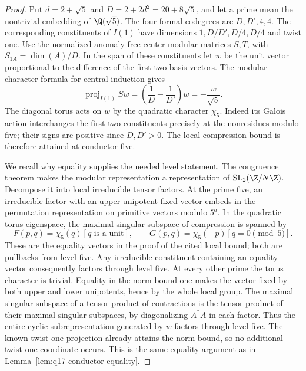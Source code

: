 \begin{proof}
Put $d=2+\sqrt5$ and $D=2+2d^2=20+8\sqrt5$, and let a prime
mean the nontrivial embedding of $\Q(\sqrt5)$. The four formal
codegrees are $D,D',4,4$. The corresponding constituents of $I(1)$
have dimensions $1,D/D',D/4,D/4$ and twist one.
Use the normalized anomaly-free center modular matrices $S,T$, with
$S_{1A}=\dim(A)/D$. In the span of these constituents let
$w$ be the unit vector proportional to the difference of the first two
basis vectors. The modular-character formula for central induction gives
\[
 \operatorname{proj}_{I(1)}Sw
   =\left(\frac1D-\frac1{D'}\right)w=-\frac{w}{\sqrt5}.
\]
The diagonal torus acts on $w$ by the quadratic character $\chi_5$.
Indeed its Galois action interchanges the first two constituents precisely
at the nonresidues modulo five; their signs are positive since $D,D'>0$.
The local compression bound \cite[Lemma~4.1]{SchDimensionBlock} is
therefore attained at conductor five.

We recall why equality supplies the needed level statement. The
congruence theorem \cite{NgCongruence} makes the modular representation a
representation of $\operatorname{SL}_2(\Z/N\Z)$. Decompose it into local
irreducible tensor factors. At the prime five, an irreducible factor
with an upper-unipotent-fixed vector embeds in the permutation
representation on primitive vectors modulo $5^a$. In the quadratic
torus eigenspace, the maximal singular subspace of compression is
spanned by
\[
 F(p,q)=\chi_5(q)[q\text{ is a unit}],\qquad
 G(p,q)=\chi_5(-p)[q=0\pmod5].
\]
These are the equality vectors in the proof of the cited local bound;
both are pullbacks from level five. Any irreducible constituent
containing an equality vector consequently factors through level five.
At every other prime the torus character is trivial. Equality in the
norm bound one makes the vector fixed by both upper and lower
unipotents, hence by the whole local group. The maximal singular
subspace of a tensor product of contractions is the tensor product of
their maximal singular subspaces, by diagonalizing $A^*A$ in each
factor. Thus the entire cyclic subrepresentation generated by $w$
factors through level five. The known twist-one projection already
attains the norm bound, so no additional twist-one coordinate occurs.
This is the same equality argument as in
Lemma~\ref{lem:q17-conductor-equality}.


\end{proof}

